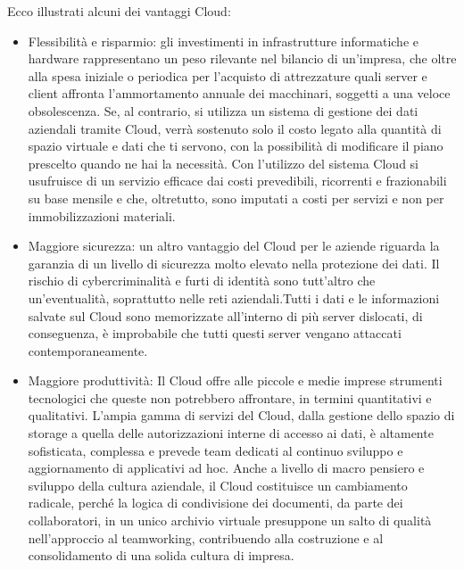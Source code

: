 Ecco illustrati alcuni dei vantaggi Cloud:
\begin{itemize}
    \item Flessibilità e risparmio: gli investimenti in infrastrutture informatiche e hardware rappresentano un peso rilevante nel bilancio di un’impresa, che oltre alla spesa iniziale o periodica per l’acquisto di attrezzature quali server e client affronta l’ammortamento annuale dei macchinari, soggetti a una veloce obsolescenza. Se, al contrario, si utilizza un sistema di gestione dei dati aziendali tramite Cloud, verrà sostenuto solo il costo legato alla quantità di spazio virtuale e dati che ti servono, con la possibilità di modificare il piano prescelto quando ne hai la necessità. Con l’utilizzo del sistema Cloud si usufruisce di un servizio efficace dai costi prevedibili, ricorrenti e frazionabili su base mensile e che, oltretutto, sono imputati a costi per servizi e non per immobilizzazioni materiali.
    \item Maggiore sicurezza: un altro vantaggio del Cloud per le aziende riguarda la garanzia di un livello di sicurezza molto elevato nella protezione dei dati. Il rischio di cybercriminalità e furti di identità sono tutt’altro che un’eventualità, soprattutto nelle reti aziendali.Tutti i dati e le informazioni salvate sul Cloud sono memorizzate all’interno di più server dislocati, di conseguenza, è improbabile che tutti questi server vengano attaccati contemporaneamente.
    \item Maggiore produttività: Il Cloud offre alle piccole e medie imprese strumenti tecnologici che queste non potrebbero affrontare, in termini quantitativi e qualitativi. L’ampia gamma di servizi del Cloud, dalla gestione dello spazio di storage a quella delle autorizzazioni interne di accesso ai dati, è altamente sofisticata, complessa e prevede team dedicati al continuo sviluppo e aggiornamento di applicativi ad hoc. Anche a livello di macro pensiero e sviluppo della cultura aziendale, il Cloud costituisce un cambiamento radicale, perché la logica di condivisione dei documenti, da parte dei collaboratori, in un unico archivio virtuale presuppone un salto di qualità nell’approccio al teamworking, contribuendo alla costruzione e al consolidamento di una solida cultura di impresa.
\end{itemize}
